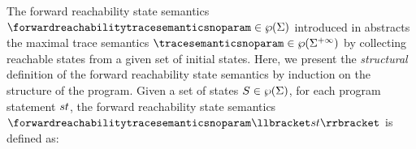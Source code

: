 

The forward reachability state semantics $\forwardreachabilitytracesemanticsnoparam\in\forwardreachabilitytracetype$ introduced in  abstracts the maximal trace semantics $\tracesemanticsnoparam\in\tracetype$ by collecting reachable states from a given set of initial states.
Here, we present the \emph{structural} definition of the forward reachability state semantics by induction on the structure of the program.
Given a set of states $S\in\wp(\Sigma)$, for each program statement $st$, the forward reachability state semantics $\forwardreachabilitytracesemanticsnoparam\semanticsof{\defstmt}$ is defined as:

